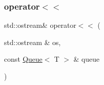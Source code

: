 \mbox{\label{classQueue_aaa89558f231cdb840804e46fc467902e}} 
\subsubsection{\texorpdfstring{operator$<$$<$}{operator<<}}
{\footnotesize\ttfamily std\+::ostream\& operator$<$$<$ (\begin{DoxyParamCaption}\item[{std\+::ostream \&}]{os,  }\item[{const \mbox{\hyperlink{classQueue}{Queue}}$<$ T $>$ \&}]{queue }\end{DoxyParamCaption})\hspace{0.3cm}{\ttfamily [friend]}}


